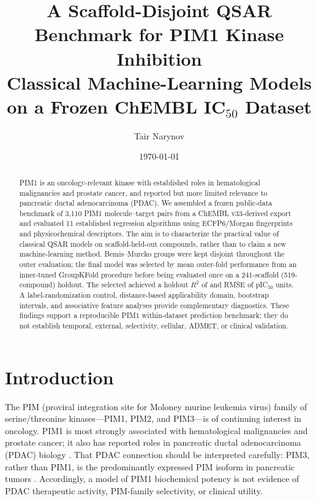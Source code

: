 \documentclass[11pt]{article}
\title{\bfseries A Scaffold-Disjoint QSAR Benchmark for PIM1 Kinase Inhibition\\[2pt]
\large Classical Machine-Learning Models on a Frozen ChEMBL IC$_{50}$ Dataset}
\author{Tair Narynov}
\date{\today}
\begin{document}


\maketitle

\begin{abstract}
PIM1 is an oncology-relevant kinase with established roles in hematological malignancies and
prostate cancer, and reported but more limited relevance to pancreatic ductal adenocarcinoma
(PDAC).  We assembled a frozen public-data benchmark of 3,110 PIM1 molecule--target pairs
from a ChEMBL v33-derived export and evaluated 11 established regression algorithms using
ECFP6/Morgan fingerprints and physicochemical descriptors.  The aim is to characterize the
practical value of classical QSAR models on scaffold-held-out compounds, rather than to claim
a new machine-learning method. Bemis--Murcko groups were kept disjoint throughout the
outer evaluation; the final model was selected by mean outer-fold performance from an
inner-tuned GroupKFold procedure before being evaluated once on a 241-scaffold
(519-compound) holdout. The selected
\SelectedModel{} achieved a holdout $R^2$ of \SelectedHoldoutRtwo{} and RMSE of
\SelectedHoldoutRMSE{} pIC$_{50}$ units.  A label-randomization control, distance-based
applicability domain, bootstrap intervals, and associative feature analyses provide complementary
diagnostics. These findings support a reproducible PIM1 within-dataset prediction benchmark;
they do not establish temporal, external, selectivity, cellular,
ADMET, or clinical validation.
\end{abstract}

\section{Introduction}

The PIM (proviral integration site for Moloney murine leukemia virus) family of
serine/threonine kinases---PIM1, PIM2, and PIM3---is of continuing interest in oncology.
PIM1 is most strongly associated with hematological malignancies and prostate cancer;
it also has reported roles in pancreatic ductal adenocarcinoma (PDAC) biology
\citep{xu2011pim1,chen2008pim1}.  That PDAC connection should be interpreted carefully:
PIM3, rather than PIM1, is the predominantly expressed PIM isoform in pancreatic tumors
\citep{li2006pim3}.  Accordingly, a model of PIM1 biochemical potency is not evidence
of PDAC therapeutic activity, PIM-family selectivity, or clinical utility.
\end{document}
